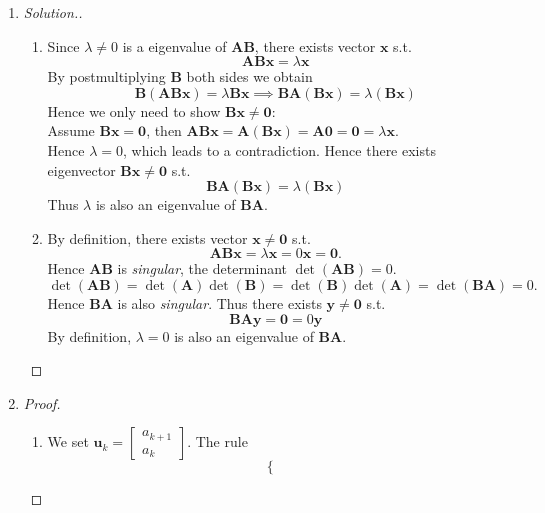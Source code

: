 \begin{enumerate}
\begin{proof}
\begin{align*}
&=\left[\bm S(\bm D-\lambda_1\bm I)\bm S^{-1}\right]\dots\left[\bm S(\bm D-\lambda_n\bm I)\bm S^{-1}\right]=\bm S(\bm D-\lambda_1\bm I)\dots(\bm D-\lambda_n\bm I)\bm S^{-1}
\end{align*}
For each term $(\bm D-\lambda_i\bm I)$, $i\in\{1,2,\dots,n\}$, we find its $i$th row are all zero.\\
Hence the product $(\bm D-\lambda_1\bm I)\dots(\bm D-\lambda_n\bm I)$ must be zero matrix.\\
Hence $\bm B=\bm S(\bm D-\lambda_1\bm I)\dots(\bm D-\lambda_n\bm I)\bm S^{-1}$ is a \textit{zero matrix}.
\end{proof}
\item
\begin{proof}[Solution.]
\begin{enumerate}
\item
Since $\lambda\ne0$ is a eigenvalue of $\bm{AB}$, there exists vector $\bm x$ s.t.
\[
\bm{AB}\bm x=\lambda\bm x
\]
By postmultiplying $\bm B$ both sides we obtain
\[
\bm B(\bm{AB}\bm x)=\lambda\bm B\bm x
\implies \bm{BA}(\bm B\bm x)=\lambda(\bm B\bm x)
\]
Hence we only need to show $\bm B\bm x\ne\bm 0:$\\
Assume $\bm B\bm x=\bm 0$, then $\bm{AB}\bm x=\bm A(\bm B\bm x)=\bm A\bm 0=\bm 0=\lambda\bm x.$\\
Hence $\lambda=0$, which leads to a contradiction. Hence there exists eigenvector $\bm B\bm x\ne\bm 0$ s.t.
\[
\bm{BA}(\bm B\bm x)=\lambda(\bm B\bm x)
\]
Thus $\lambda$ is also an eigenvalue of $\bm{BA}.$
\item
By definition, there exists vector $\bm x\ne\bm0$ s.t.
\[
\bm{AB}\bm x=\lambda\bm x=0\bm x=\bm0.
\]
Hence $\bm{AB}$ is \textit{singular}, the determinant $\det(\bm{AB})=0.$\\
\[
\det(\bm{AB})=\det(\bm A)\det(\bm B)=\det(\bm B)\det(\bm A)=\det(\bm{BA})=0.
\]
Hence $\bm{BA}$ is also \textit{singular}. Thus there exists $\bm y\ne\bm0$ s.t.
\[
\bm{BA}\bm y=\bm0=0\bm y
\]
By definition, $\lambda=0$ is also an eigenvalue of $\bm{BA}.$
\end{enumerate}
\end{proof}
\item
\begin{proof}
\begin{enumerate}
\item
We set $\bm u_{k}=\begin{bmatrix}
a_{k+1}\\a_{k}
\end{bmatrix}$. The rule 
\[\left\{\begin{aligned}

\end{aligned}\]
\end{enumerate}
\end{proof}
\end{enumerate}
